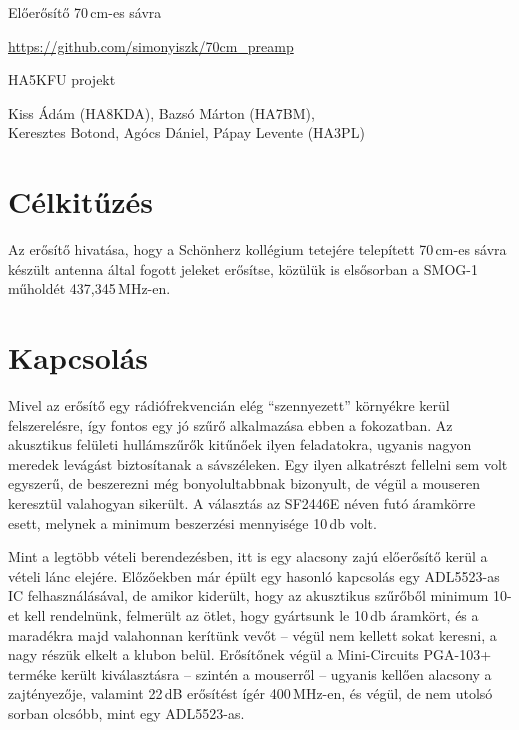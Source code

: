 \begin{center}
	
	\Huge
	Előerősítő 70\,cm-es sávra
	
	\Large
	\url{https://github.com/simonyiszk/70cm_preamp}
	
	\Large
	HA5KFU projekt
	
	\Large
	Kiss Ádám (HA8KDA), Bazsó Márton (HA7BM), \\ Keresztes Botond, Agócs Dániel, Pápay Levente (HA3PL)
\end{center}

\tableofcontents

\listoffigures

\newpage

\section{Célkitűzés}
\label{sec:celkituzes}

Az erősítő hivatása, hogy a Schönherz kollégium tetejére telepített 70\,cm-es sávra készült antenna által fogott jeleket erősítse, közülük is elsősorban a SMOG-1 műholdét 437,345\,MHz-en.


\section{Kapcsolás}
\label{sec:kapcsolas}

Mivel az erősítő egy rádiófrekvencián elég \enquote{szennyezett} környékre kerül felszerelésre, így fontos egy jó szűrő alkalmazása ebben a fokozatban. Az akusztikus felületi hullámszűrők kitűnőek ilyen feladatokra, ugyanis nagyon meredek levágást biztosítanak a sávszéleken. Egy ilyen alkatrészt fellelni sem volt egyszerű, de beszerezni még bonyolultabbnak bizonyult, de végül a mouseren keresztül valahogyan sikerült. A választás az SF2446E\cite{SAW} néven futó áramkörre esett, melynek a minimum beszerzési mennyisége 10\,db volt.

Mint a legtöbb vételi berendezésben, itt is egy alacsony zajú előerősítő kerül a vételi lánc elejére. Előzőekben már épült egy hasonló kapcsolás egy ADL5523-as IC felhasználásával, de amikor kiderült, hogy az akusztikus szűrőből minimum 10-et kell rendelnünk, felmerült az ötlet, hogy gyártsunk le 10\,db áramkört, és a maradékra majd valahonnan kerítünk vevőt -- végül nem kellett sokat keresni, a nagy részük elkelt a klubon belül. Erősítőnek végül a Mini-Circuits PGA-103+\cite{PGA} terméke került kiválasztásra -- szintén a mouserről -- ugyanis kellően alacsony a zajtényezője, valamint 22\,dB erősítést ígér 400\,MHz-en, és végül, de nem utolsó sorban olcsóbb, mint egy ADL5523-as.

